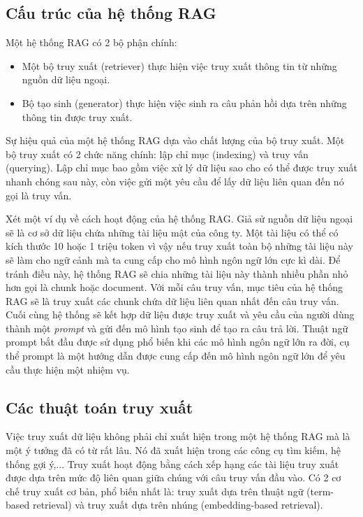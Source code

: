 \vspace{1em}
\subsection{Cấu trúc của hệ thống RAG}

Một hệ thống RAG có 2 bộ phận chính: 
\begin{itemize}
    \item Một bộ truy xuất (retriever) thực hiện việc truy xuất thông tin từ những nguồn dữ liệu ngoại.
    \item Bộ tạo sinh (generator) thực hiện việc sinh ra câu phản hồi dựa trên những thông tin được truy xuất.
\end{itemize}

Sự hiệu quả của một hệ thống RAG dựa vào chất lượng của bộ truy xuất. Một bộ truy xuất có 2 chức năng chính: lập chỉ mục (indexing) và truy vấn (querying). Lập chỉ mục bao gồm việc xử lý dữ liệu sao cho có thể được truy xuất nhanh chóng sau này, còn việc gửi một yêu cầu để lấy dữ liệu liên quan đến nó gọi là truy vấn.

Xét một ví dụ về cách hoạt động của hệ thống RAG. Giả sử nguồn dữ liệu ngoại sẽ là cơ sở dữ liệu chứa những tài liệu mật của công ty. Một tài liệu có thể có kích thước 10 hoặc 1 triệu token vì vậy nếu truy xuất toàn bộ những tài liệu này sẽ làm cho ngữ cảnh mà ta cung cấp cho mô hình ngôn ngữ lớn cực kì dài. Để tránh điều này, hệ thống RAG sẽ chia những tài liệu này thành nhiều phần nhỏ hơn gọi là chunk hoặc document. Với mỗi câu truy vấn, mục tiêu của hệ thống RAG sẽ là truy xuất các chunk chứa dữ liệu liên quan nhất đến câu truy vấn. Cuối cùng hệ thống sẽ kết hợp dữ liệu được truy xuất và yêu cầu của người dùng thành một \textit{prompt} và gửi đến mô hình tạo sinh để tạo ra câu trả lời. Thuật ngữ prompt bắt đầu được sử dụng phổ biến khi các mô hình ngôn ngữ lớn ra đời, cụ thể prompt là một hướng dẫn được cung cấp đến mô hình ngôn ngữ lớn để yêu cầu thực hiện một nhiệm vụ.

\vspace{1em}
\subsection{Các thuật toán truy xuất}
Việc truy xuất dữ liệu không phải chỉ xuất hiện trong một hệ thống RAG mà là một ý tưởng đã có từ rất lâu. Nó đã xuất hiện trong các công cụ tìm kiếm, hệ thống gợi ý,... Truy xuất hoạt động bằng cách xếp hạng các tài liệu truy xuất được dựa trên mức độ liên quan giữa chúng với câu truy vấn đầu vào. Có 2 cơ chế truy xuất cơ bản, phổ biến nhất là: truy xuất dựa trên thuật ngữ (term-based retrieval) và truy xuất dựa trên nhúng (embedding-based retrieval).

